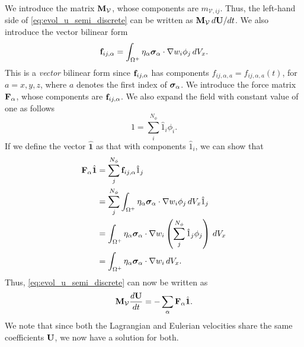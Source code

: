 \documentclass[11pt]{report}
\begin{document}
We introduce the matrix $\mathbf{M}_\mathcal{V}$, whose components are $m_{\mathcal{V},ij}$. Thus, the left-hand side of \cref{eq:evol_u_semi_discrete} can be written as $\mathbf{M}_\mathcal{V} \, d\mathbf{U} / dt$.
We also introduce the vector bilinear form
\begin{equation}
    \mathbf{f}_{ij,\alpha} = \int_{\Omega^+} \eta_\alpha \bm \sigma_\alpha \cdot \nabla w_i \phi_j \, dV_x.
\end{equation}
This is a \textit{vector} bilinear form since $\mathbf{f}_{ij,\alpha}$ has components $f_{ij,\alpha,a} = f_{ij,\alpha,a}(t)$, for $a = x,y,z$, where $a$ denotes the first index of $\bm \sigma_\alpha$. We introduce the force matrix $\mathbf{F}_\alpha$, whose components are $\mathbf{f}_{ij,\alpha}$. We also expand the field with constant value of one as follows
\begin{equation*}
    1 = \sum_i^{N_\phi} \hat{1}_i \phi_i.
\end{equation*}
If we define the vector $\hat{\mathbf{1}}$ as that with components $\hat{1}_i$, we can show that 
\begin{align*}
    \mathbf{F}_\alpha \hat{\mathbf{1}} &= \sum_j^{N_\phi} \mathbf{f}_{ij,\alpha} \hat{1}_j \nonumber \\
    &= \sum_j^{N_\phi} \int_{\Omega^+} \eta_\alpha \bm \sigma_\alpha \cdot \nabla w_i \phi_j \, dV_x \hat{1}_j \nonumber \\
    &= \int_{\Omega^+} \eta_\alpha \bm \sigma_\alpha \cdot \nabla w_i \left ( \sum_j^{N_\phi} \hat{1}_j \phi_j \right ) \, dV_x \nonumber \\
    &= \int_{\Omega^+} \eta_\alpha \bm \sigma_\alpha \cdot \nabla w_i \, dV_x.
\end{align*}
Thus, \cref{eq:evol_u_semi_discrete} can now be written as
\begin{equation}
    \label{eq:evol_vel_semi_discrete}
    \mathbf{M}_\mathcal{V} \frac{d\mathbf{U}}{dt} = -\sum_\alpha \mathbf{F}_\alpha \hat{\mathbf{1}}.
\end{equation}
We note that since both the Lagrangian and Eulerian velocities share the same coefficients $\mathbf{U}$, we now have a solution for both.

\end{document}
